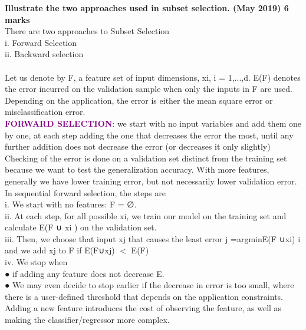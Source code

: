 
\textbf{\textcolor{LightMagenta}{Illustrate the two approaches used in subset selection. (May 2019) \hfill 6 marks}}
\\[5pt]

	There are two approaches to Subset Selection \\
	
    \hspace*{10pt}i.	Forward Selection \\
    \hspace*{10pt}ii.	Backward selection \\
    \\ Let us denote by F, a feature set of input dimensions, xi, i = 1,...,d.
E(F) denotes the error incurred on the validation sample when only the inputs in F are used. Depending on the application, the error is either the mean square error or misclassification error.
\\

\textbf {\textcolor{purple}{FORWARD SELECTION}}: we start with no input variables and add them one by one, at each step adding the one that decreases the error the most, until any further addition does not decrease the error (or decreases it only slightly)
Checking of the error is done on a validation set distinct from the training set because we want to test the generalization accuracy. With more features, generally we have lower training error, but not necessarily lower validation error. \\
In sequential forward selection, the steps are
\\ \hspace*{10pt}i.	We start with no features: F = ∅.
\\ \hspace*{10pt}ii.	At each step, for all possible xi, we train our model on the training set and calculate
E(F ∪ xi ) on the validation set.\\
 \hspace*{10pt}iii.	Then, we choose that input xj that causes the least error
j =argminE(F ∪xi) i
and we add xj to F if E(F∪xj) $<$ E(F)\\
 \hspace*{10pt}iv.	We stop when\\
 ●	if adding any feature does not decrease E.\\
●	We may even decide to stop earlier if the decrease in error is too small, where there is a user-defined threshold that depends on the application constraints.
Adding a new feature introduces the cost of observing the feature, as well as making the classifier/regressor more complex.


